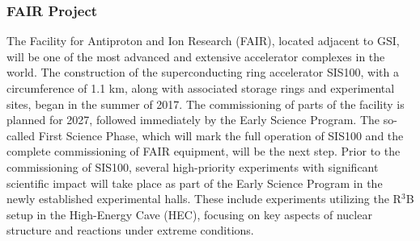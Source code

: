 \subsubsection{FAIR Project}
The Facility for Antiproton and Ion Research (FAIR), located adjacent to GSI, will be one of the most advanced and extensive accelerator complexes in the world. The construction of the superconducting ring accelerator SIS100, with a circumference of 1.1 km, along with associated storage rings and experimental sites, began in the summer of 2017. The commissioning of parts of the facility is planned for 2027, followed immediately by the Early Science Program.\newline  
The so-called First Science Phase, which will mark the full operation of SIS100 and the complete commissioning of FAIR equipment, will be the next step. Prior to the commissioning of SIS100, several high-priority experiments with significant scientific impact will take place as part of the Early Science Program in the newly established experimental halls. These include experiments utilizing the R$^3$B setup in the High-Energy Cave (HEC), focusing on key aspects of nuclear structure and reactions under extreme conditions.

